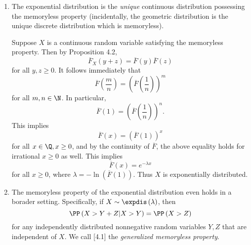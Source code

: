 \documentclass[stat333]{subfiles}
\begin{document}
    \np
    \begin{enumerate}
        \item The exponential distribution is the \textit{unique} continuous distribution possessing the memoryless property (incidentally, the geometric distribution is the unique discrete distribution which is memoryless). 

            \begin{subproof}
                Suppose $X$ is a continuous random variable satisfying the memoryless property. Then by Proposition 4.2,
                \begin{equation*}
                    \overline{F}_X\left( y+z \right) = \overline{F}\left( y \right)\overline{F}\left( z \right)
                \end{equation*}
                for all $y,z\geq 0$. It follows immediately that
                \begin{equation*}
                    \overline{F}\left( \frac{m}{n} \right) = \left( \overline{F}\left( \frac{1}{n} \right)\right)^m
                \end{equation*}
                for all $m,n\in\N$. In particular,
                \begin{equation*}
                    \overline{F}\left( 1 \right) = \left( \overline{F}\left( \frac{1}{n} \right) \right)^n.
                \end{equation*}
                This implies
                \begin{equation*}
                    \overline{F}\left( x \right) = \left( \overline{F}\left( 1 \right) \right)^x
                \end{equation*}
                for all $x\in\Q, x\geq 0$, and by the continuity of $\overline{F}$, the above equality holds for irrational $x\geq 0$ as well. This implies
                \begin{equation*}
                    \overline{F}\left( x \right) = e^{-\lambda x}
                \end{equation*}
                for all $x\geq 0$, where $\lambda = -\ln\left( \overline{F}\left( 1 \right) \right)$. Thus $X$ is exponentially distributed.
            \end{subproof}

        \item The memoryless property of the exponential distribution even holds in a borader setting. Specifically, if $X\sim\expdis\left( \lambda \right)$, then
            \begin{equation}
                \PP\left( X>Y+Z|X>Y \right)=\PP\left( X>Z \right)
            \end{equation}
            for any independently distributed nonnegative random variables $Y,Z$ that are independent of $X$. We call [4.1] the \textit{generalized memoryless property}.


\end{enumerate}
\end{document}
